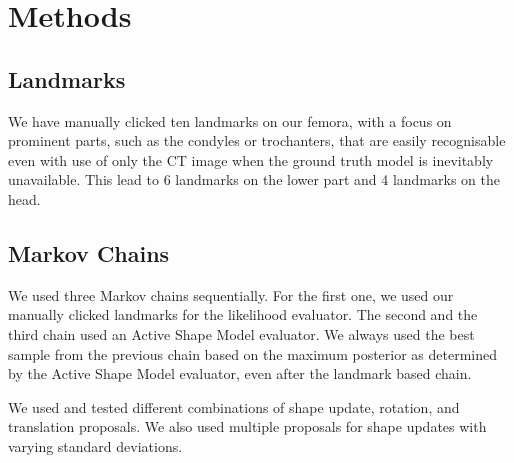 \section{Methods}
\label{sec:methods}

\subsection{Landmarks}
\label{subsec:landmarks}

We have manually clicked ten landmarks on our femora, with a focus on prominent parts, such as the condyles or trochanters, that are easily recognisable even with use of only the CT image when the ground truth model is inevitably unavailable. This lead to 6 landmarks on the lower part and 4 landmarks on the head.

\subsection{Markov Chains}
\label{subsec:markovchains}

We used three Markov chains sequentially. For the first one, we used our manually clicked landmarks for the likelihood evaluator. The second and the third chain used an Active Shape Model evaluator. We always used the best sample from the previous chain based on the maximum posterior as determined by the Active Shape Model evaluator, even after the landmark based chain.

We used and tested different combinations of shape update, rotation, and translation proposals. We also used multiple proposals for shape updates with varying standard deviations.
